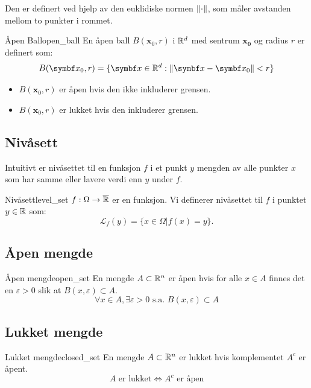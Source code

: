 Den er definert ved hjelp av den euklidiske normen \(\lVert\cdot\rVert\), som måler avstanden mellom to punkter i rommet.

\begin{definition}{Åpen Ball}{open_ball}
	En åpen ball \(B(\mathbf{x}_0, r)\) i \(\mathbb{R}^d\) med sentrum \(\mathbf{x_0}\) og radius \(r\) er definert som:
	\[
		B(\mathbf{x}_0, r) = \{ \mathbf{x} \in \R^d : \norm{\mathbf{x} - \mathbf{x}_0} < r\}
	\]
	\begin{itemize}
		\item \(B(\mathbf{x}_0, r)\) er åpen hvis den ikke inkluderer grensen.
		\item \(B(\mathbf{x}_0, r)\) er lukket hvis den inkluderer grensen.
	\end{itemize}
\end{definition}

\subsection{Nivåsett}
Intuitivt er nivåsettet til en funksjon \( f \) i et punkt \( y \) mengden av alle punkter \( x \) som har samme eller lavere verdi enn \( y \) under \( f \).
\begin{definition}{Nivåsett}{level_set}
	\(f: \Omega \to \overline{\mathbb{R}}\) er en funksjon. Vi definerer nivåsettet til \(f\) i punktet \(y \in \mathbb{R}\) som:
	\[
		\mathcal{L}_f(y) = \{x \in \Omega | f(x) = y\}.
	\]
\end{definition}

\subsection{Åpen mengde}

\begin{definition}{Åpen mengde}{open_set}
	En mengde \(A \subset \mathbb{R}^n\) er åpen hvis for alle \(x \in A\) finnes det en \(\varepsilon > 0\) slik at \(B(x, \varepsilon) \subset A\).
	\[
		\forall x \in A, \exists \varepsilon > 0 \text{ s.a. } B(x, \varepsilon) \subset A
	\]
\end{definition}

\subsection{Lukket mengde}
\begin{definition}{Lukket mengde}{closed_set}
	En mengde \(A \subset \mathbb{R}^n\) er lukket hvis komplementet \(A^c\) er åpent.
	\[
		A \text{ er lukket} \Leftrightarrow A^c \text{ er åpen}
	\]
\end{definition}

